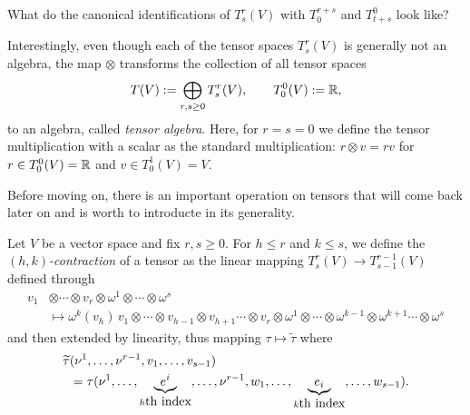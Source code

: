 \begin{exercise}
  What do the canonical identifications of $T_s^r(V)$ with $T_0^{r+s}$ and $T_{t+s}^0$ look like?
\end{exercise}

\begin{remark}
  Interestingly, even though each of the tensor spaces $T_s^r(V)$ is generally not an algebra, the map $\otimes$ transforms the collection of all tensor spaces
  \begin{equation}
    T(V) := \bigoplus_{r,s\geq 0} T_s^r(V), \qquad T_0^0(V):= \mathbb{R},
  \end{equation}
  to an algebra, called \emph{tensor algebra}.
  Here, for $r=s=0$ we define the tensor multiplication with a scalar as the standard multiplication: $r\otimes v = r v$ for $r\in T_0^0(V)=\mathbb{R}$ and $v\in T^1_0(V)=V$.
\end{remark}

Before moving on, there is an important operation on tensors that will come back later on and is worth to introducte in its generality.

\begin{definition}
Let $V$ be a vector space and fix $r,s\geq0$.
For $h\leq r$ and $k\leq s$, we define the \emph{$(h,k)$-contraction} of a tensor as the linear mapping $T_s^r(V)\to T_{s-1}^{r-1}(V)$ defined through
\begin{align}
  v_1&\otimes\cdots\otimes v_r\otimes\omega^1\otimes\cdots\otimes\omega^s \\
  &\mapsto \omega^k(v_h)\, v_1\otimes\cdots\otimes v_{h-1}\otimes v_{h+1}\cdots\otimes v_r\otimes\omega^1\otimes\cdots\otimes\omega^{k-1}\otimes\omega^{k+1}\cdots\otimes\omega^s
\end{align}
and then extended by linearity, thus mapping $\tau \mapsto \widetilde\tau$ where
\begin{align}
  \widetilde\tau&(\nu^1,\ldots,\nu^{r-1}, v_1,\ldots,v_{s-1}) \\
  &= \tau(\nu^1,\ldots,\LaTeXunderbrace{e^i}_{h\mbox{th index}},\ldots,\nu^{r-1},w_1,\ldots,\LaTeXunderbrace{e_i}_{k\mbox{th index}},\ldots,w_{s-1}).
\end{align}
\end{definition}

